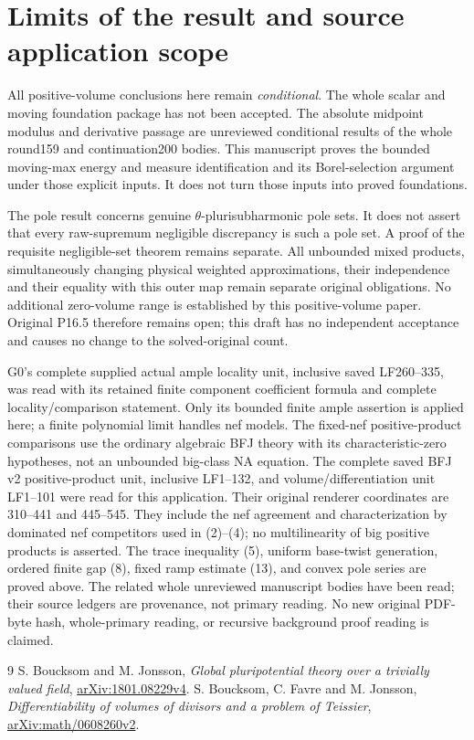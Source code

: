 \documentclass[11pt]{article}
\begin{document}
\section{Limits of the result and source application scope}
All positive-volume conclusions here remain \emph{conditional}.
The whole scalar and moving foundation package has not been accepted.
The absolute midpoint modulus and derivative passage are unreviewed
conditional results of the whole round159 and continuation200 bodies.
This manuscript proves the bounded moving-max energy and measure
identification and its Borel-selection argument under those explicit inputs.
It does not turn those inputs into proved foundations.

The pole result concerns genuine $\theta$-plurisubharmonic pole sets.
It does not assert that every raw-supremum negligible discrepancy is
such a pole set. A proof of the requisite negligible-set theorem remains
separate. All unbounded mixed products, simultaneously changing physical
weighted approximations, their independence and their equality with this
outer map remain separate original obligations. No additional zero-volume
range is established by this positive-volume paper.
Original P16.5 therefore remains open; this draft has no independent
acceptance and causes no change to the solved-original count.

G0's complete supplied actual ample locality unit, inclusive saved
LF260--335, was read with its retained finite component coefficient
formula and complete locality/comparison statement. Only its bounded
finite ample assertion is applied here; a finite polynomial limit
handles nef models. The fixed-nef positive-product comparisons use the
ordinary algebraic BFJ theory with its characteristic-zero hypotheses,
not an unbounded big-class NA equation.
The complete saved BFJ v2 positive-product unit, inclusive LF1--132,
and volume/differentiation unit LF1--101 were read for this application.
Their original renderer coordinates are 310--441 and 445--545.
They include the nef agreement and characterization by dominated nef
competitors used in (2)--(4); no multilinearity of big positive
products is asserted.
The trace inequality (5), uniform base-twist generation, ordered
finite gap (8), fixed ramp estimate (13), and convex pole series are
proved above. The related whole unreviewed manuscript bodies have
been read; their source ledgers are provenance, not primary reading.
No new original PDF-byte hash, whole-primary reading, or recursive
background proof reading is claimed.

\begin{thebibliography}{9}
 S. Boucksom and M. Jonsson,
\emph{Global pluripotential theory over a trivially valued field},
\href{https://arxiv.org/pdf/1801.08229v4}{arXiv:1801.08229v4}.
 S. Boucksom, C. Favre and M. Jonsson,
\emph{Differentiability of volumes of divisors and a problem of Teissier},
\href{https://arxiv.org/html/math/0608260v2}{arXiv:math/0608260v2}.
\end{thebibliography}
\end{document}
